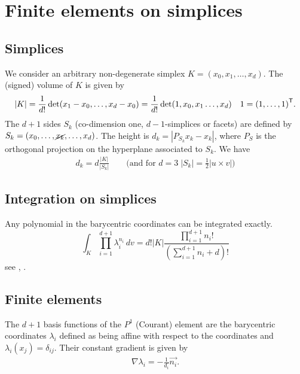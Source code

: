 %
\section{Finite elements on simplices}\label{sec:}
%
%
\subsection{Simplices}\label{subsec:}
%
We consider an arbitrary non-degenerate simplex $K=(x_0,x_1,\ldots, x_{d})$. The (signed) volume of $K$ is given by
%
\begin{equation}\label{eq:}
|K| = \frac{1}{d!} \det(x_1-x_{0},\ldots, x_{d}-x_{0})= \frac{1}{d!} \det(1,x_{0},x_1\ldots, x_{d})\quad 1={(1,\ldots,1)}^{\mathsf{T}}.
\end{equation}
%
The $d+1$ sides $S_k$ (co-dimension one, $d-1$-simplices or facets) are defined by
$S_k=(x_0,\ldots, \cancel{x_k}, \ldots, x_{d})$. The height is $d_k=|P_{S_k}x_k - x_k|$, where $P_S$ is the orthogonal projection on the hyperplane associated to $S_k$. We have
%
\begin{align*}
d_k = d\frac{|K|}{|S_k|} \qquad\mbox{(and for $d=3 \; |S_k| = \frac12 |u\times v| $)}
\end{align*}
%
%
\subsection{Integration on simplices}\label{subsec:}
%
%
Any polynomial in the barycentric coordinates can be integrated exactly.
%
\begin{equation}\label{eq:}
\int_K \prod_{i=1}^{d+1}\lambda_i^{n_i} \,dv = d!|K|\frac{\prod\limits_{i=1}^{d+1} n_i!}{\left( \sum\limits_{i=1}^{d+1} n_i + d\right)!}
\end{equation}
%
see \cite{EisenbergMalvern73}, \cite{VermolenSegal18}.
%

%
\subsection{Finite elements}\label{subsec:}
%
%
The $d+1$ basis functions of the $P^1$ (Courant) element are the barycentric coordinates 
$\lambda_i$ defined as being affine with respect to the coordinates and $\lambda_i(x_j)=\delta_{ij}$. Their constant gradient is given by
%
\begin{align*}
\nabla \lambda_i = - \frac{1}{d_i}\vec{n_i}. 
\end{align*}
%
%

\printbibliography[title=References Section~\thesection]

